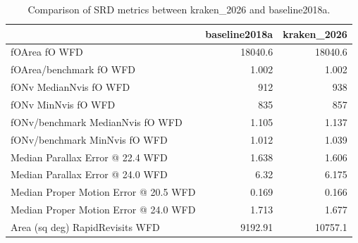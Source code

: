 \documentclass[DM,lsstdraft,authoryear,toc]{lsstdoc}
\begin{document}
\begin{table}[htp]
\caption{Comparison of SRD metrics between kraken\_2026 and baseline2018a.}
\begin{center}
\small
\begin{tabular}{lrr}
\toprule
{}                                                                                       &   baseline2018a &   kraken\_2026 \\
\midrule
 fOArea fO WFD                                           &       18040.6       &     18040.6   \\
 fOArea/benchmark fO WFD                        &           1.002       &         1.002 \\
 fONv MedianNvis fO WFD                          &         912            &       938     \\
 fONv MinNvis fO WFD                                &         835            &       857     \\
 fONv/benchmark MedianNvis fO WFD       &           1.105       &         1.137 \\
 fONv/benchmark MinNvis fO WFD             &           1.012       &         1.039 \\
 Median Parallax Error @ 22.4 WFD                               &           1.638       &         1.606 \\
 Median Parallax Error @ 24.0 WFD                               &           6.32         &        6.175 \\
 Median Proper Motion Error @ 20.5 WFD                     &          0.169        &        0.166 \\
 Median Proper Motion Error @ 24.0 WFD                     &           1.713       &         1.677 \\
  Area (sq deg) RapidRevisits WFD                                &     9192.91        &       10757.1 \\
\bottomrule
\end{tabular}
\end{center}
\label{tab:srd-comparison}
\end{table}
\end{document}
